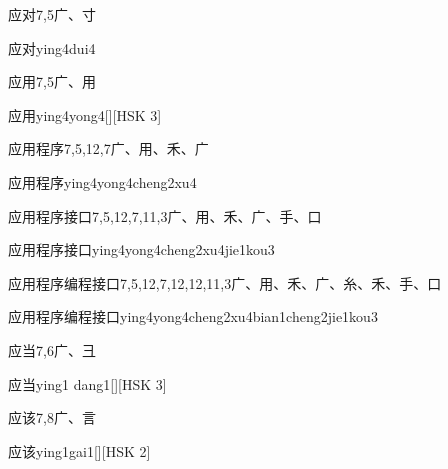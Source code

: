 \begin{entry}{应对}{7,5}{⼴、⼨}
  \begin{phonetics}{应对}{ying4dui4}
  \end{phonetics}
\end{entry}

\begin{entry}{应用}{7,5}{⼴、⽤}
  \begin{phonetics}{应用}{ying4yong4}[][HSK 3]
  \end{phonetics}
\end{entry}

\begin{entry}{应用程序}{7,5,12,7}{⼴、⽤、⽲、⼴}
  \begin{phonetics}{应用程序}{ying4yong4cheng2xu4}
  \end{phonetics}
\end{entry}

\begin{entry}{应用程序接口}{7,5,12,7,11,3}{⼴、⽤、⽲、⼴、⼿、⼝}
  \begin{phonetics}{应用程序接口}{ying4yong4cheng2xu4jie1kou3}
  \end{phonetics}
\end{entry}

\begin{entry*}{应用程序编程接口}{7,5,12,7,12,12,11,3}{⼴、⽤、⽲、⼴、⽷、⽲、⼿、⼝}
  \begin{phonetics}{应用程序编程接口}{ying4yong4cheng2xu4bian1cheng2jie1kou3}
  \end{phonetics}
\end{entry*}

\begin{entry}{应当}{7,6}{⼴、⼹}
  \begin{phonetics}{应当}{ying1 dang1}[][HSK 3]
  \end{phonetics}
\end{entry}

\begin{entry}{应该}{7,8}{⼴、⾔}
  \begin{phonetics}{应该}{ying1gai1}[][HSK 2]
  \end{phonetics}
\end{entry}

